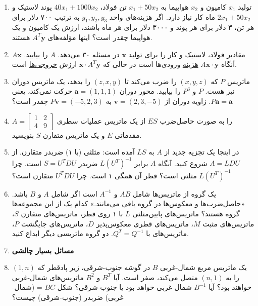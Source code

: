 \documentclass[12pt, a4paper]{book}
\begin{document}
\begin{enumerate}
		\item تولید $x_1$ کامیون و $x_2$ هواپیما به $x_1+50x_2$ تن فولاد، $40x_1+1000x_2$ پوند لاستیک و $2x_1+50x_2$ ماه کار نیاز دارد. اگر هزینه‌های واحد $y_1, y_2, y_3$ به ترتیب ۷۰۰ دلار برای هر تن، ۳ دلار برای هر پوند و ۳۰۰۰ دلار برای هر ماه باشند، ارزش یک کامیون و یک هواپیما چقدر است؟ اینها مؤلفه‌های $A^T\mathbf{y}$ هستند.
		
		\item $A\mathbf{x}$ مقادیر فولاد، لاستیک و کار را برای تولید $\mathbf{x}$ در مسئله ۳۰ می‌دهد. $A$ را بیابید. آنگاه $A\mathbf{x} \cdot \mathbf{y}$ \underline{هزینه} ورودی‌ها است در حالی که $\mathbf{x} \cdot A^T\mathbf{y}$ ارزش \underline{خروجی‌ها} است.
		
		\item ماتریس $P$ که $(x,y,z)$ را ضرب می‌کند تا $(z,x,y)$ را بدهد، یک ماتریس دوران نیز هست. $P$ و $P^3$ را بیابید. محور دوران $\mathbf{a}=(1,1,1)$ حرکت نمی‌کند، یعنی $P\mathbf{a}=\mathbf{a}$. زاویه دوران از $\mathbf{v}=(2,3,-5)$ به $P\mathbf{v}=(-5,2,3)$ چقدر است؟
		
		\item $A = \begin{bmatrix} 1 & 2 \\ 4 & 9 \end{bmatrix}$ را به صورت حاصل‌ضرب $ES$ از یک ماتریس عملیات سطری مقدماتی $E$ و یک ماتریس متقارن $S$ بنویسید.
		
		\item در اینجا یک تجزیه جدید از $A$ به $LS$ آمده است: مثلثی (با ۱) ضربدر متقارن.
		از $A=LDU$ شروع کنید. آنگاه $A$ برابر $L(U^T)^{-1}$ ضربدر $S=U^TDU$ است.
		چرا $L(U^T)^{-1}$ مثلثی است؟ قطر آن همگی ۱ است. چرا $U^TDU$ متقارن است؟
		
		\item یک گروه از ماتریس‌ها شامل $AB$ و $A^{-1}$ است اگر شامل $A$ و $B$ باشد. «حاصل‌ضرب‌ها و معکوس‌ها در گروه باقی می‌مانند.» کدام یک از این مجموعه‌ها گروه هستند؟
		ماتریس‌های پایین‌مثلثی $L$ با ۱ روی قطر، ماتریس‌های متقارن $S$، ماتریس‌های مثبت $M$، ماتریس‌های قطری معکوس‌پذیر $D$، ماتریس‌های جایگشت $P$، ماتریس‌های با $Q^T=Q^{-1}$. دو گروه ماتریسی دیگر ابداع کنید.
		
		\item[] \textbf{مسائل بسیار چالشی}
		
		\item یک ماتریس مربع شمال-غربی $B$ در گوشه جنوب-شرقی، زیر پادقطر که $(1,n)$ را به $(n,1)$ متصل می‌کند، صفر است. آیا $B^T$ و $B^2$ ماتریس‌های شمال-غربی خواهند بود؟ آیا $B^{-1}$ شمال-غربی خواهد بود یا جنوب-شرقی؟ شکل $BC$ = (شمال-غربی) ضربدر (جنوب-شرقی) چیست؟
		

\end{enumerate}
\end{document}
